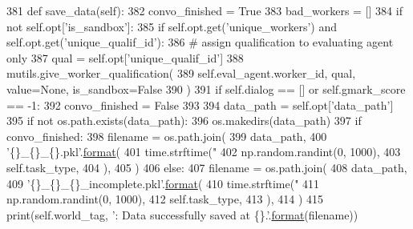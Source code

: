 \begin{DoxyCode}
381     \textcolor{keyword}{def }save\_data(self):
382         convo\_finished = \textcolor{keyword}{True}
383         bad\_workers = []
384         \textcolor{keywordflow}{if} \textcolor{keywordflow}{not} self.opt[\textcolor{stringliteral}{'is\_sandbox'}]:
385             \textcolor{keywordflow}{if} self.opt.get(\textcolor{stringliteral}{'unique\_workers'}) \textcolor{keywordflow}{and} self.opt.get(\textcolor{stringliteral}{'unique\_qualif\_id'}):
386                 \textcolor{comment}{# assign qualification to evaluating agent only}
387                 qual = self.opt[\textcolor{stringliteral}{'unique\_qualif\_id'}]
388                 mutils.give\_worker\_qualification(
389                     self.eval\_agent.worker\_id, qual, value=\textcolor{keywordtype}{None}, is\_sandbox=\textcolor{keyword}{False}
390                 )
391         \textcolor{keywordflow}{if} self.dialog == [] \textcolor{keywordflow}{or} self.gmark\_score == -1:
392             convo\_finished = \textcolor{keyword}{False}
393 
394         data\_path = self.opt[\textcolor{stringliteral}{'data\_path'}]
395         \textcolor{keywordflow}{if} \textcolor{keywordflow}{not} os.path.exists(data\_path):
396             os.makedirs(data\_path)
397         \textcolor{keywordflow}{if} convo\_finished:
398             filename = os.path.join(
399                 data\_path,
400                 \textcolor{stringliteral}{'\{\}\_\{\}\_\{\}.pkl'}.\hyperlink{namespaceparlai_1_1chat__service_1_1services_1_1messenger_1_1shared__utils_a32e2e2022b824fbaf80c747160b52a76}{format}(
401                     time.strftime(\textcolor{stringliteral}{"%
402                     np.random.randint(0, 1000),
403                     self.task\_type,
404                 ),
405             )
406         \textcolor{keywordflow}{else}:
407             filename = os.path.join(
408                 data\_path,
409                 \textcolor{stringliteral}{'\{\}\_\{\}\_\{\}\_incomplete.pkl'}.\hyperlink{namespaceparlai_1_1chat__service_1_1services_1_1messenger_1_1shared__utils_a32e2e2022b824fbaf80c747160b52a76}{format}(
410                     time.strftime(\textcolor{stringliteral}{"%
411                     np.random.randint(0, 1000),
412                     self.task\_type,
413                 ),
414             )
415         print(self.world\_tag, \textcolor{stringliteral}{': Data successfully saved at \{\}.'}.\hyperlink{namespaceparlai_1_1chat__service_1_1services_1_1messenger_1_1shared__utils_a32e2e2022b824fbaf80c747160b52a76}{format}(filename))
}}
\end{DoxyCode}
